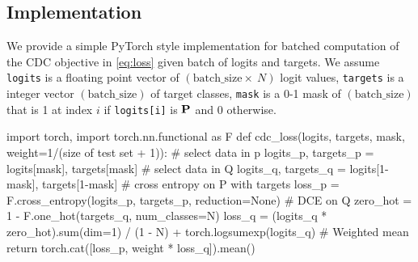 \subsection{Implementation}
We provide a simple PyTorch style implementation for batched computation of the CDC objective in \autoref{eq:loss} given batch of logits and targets.
We assume \verb!logits! is a floating point vector of $(\text{batch\_size}\times\ N)$ logit values, \verb!targets! is a integer vector $(\text{batch\_size})$ of target classes, \verb!mask! is a 0-1 mask of $(\text{batch\_size})$ that is 1 at index $i$
if \verb!logits[i]! is $\mathbf{P}$ and 0 otherwise.
\begin{python}
    import torch, import torch.nn.functional as F
    def cdc_loss(logits, targets, mask, weight=1/(size of test set + 1)):
    # select data in p
    logits_p, targets_p = logits[mask], targets[mask]
    # select data in Q
    logits_q, targets_q = logits[1-mask], targets[1-mask]
    # cross entropy on P with targets
    loss_p = F.cross_entropy(logits_p, targets_p, reduction=None)
    # DCE on Q
    zero_hot = 1 - F.one_hot(targets_q, num_classes=N)
    loss_q = (logits_q * zero_hot).sum(dim=1) / (1 - N)
    + torch.logsumexp(logits_q)
    # Weighted mean
    return torch.cat([loss_p, weight * loss_q]).mean()
\end{python}